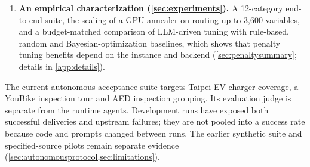 \begin{enumerate}
{        them (\cref{sec:system,sec:experiments}).} We document recurring failures (empty objectives, constraint
        penalties folded into the objective, silent over-simplification into a sortable problem, dropped hard
        constraints, exhausted reasoning budgets, prompt overflow on large models) and the generic mechanisms
        that address them: task splitting, repair instead of rewrite, constraint families and prompt budgets.
        The current system also implements bounded data-to-model repair and optional retrieval of general
        modelling patterns; their end-to-end effects require the ablations in \cref{sec:autonomousprotocol}.
  \item \textbf{An empirical characterization (\cref{sec:experiments}).} A 12-category end-to-end suite, the
        scaling of a GPU annealer on routing up to 3{,}600 variables, and a budget-matched comparison of
        LLM-driven tuning with rule-based, random and Bayesian-optimization baselines, which shows that penalty
        tuning benefits depend on the instance and backend (\cref{sec:penaltysummary}; details in \cref{app:details}).
\end{enumerate}

The current autonomous acceptance suite targets Taipei EV-charger coverage, a YouBike inspection tour and AED
inspection grouping. Its evaluation judge is separate from the runtime agents. Development runs have exposed
both successful deliveries and upstream failures; they are not pooled into a success rate because code and
prompts changed between runs. The earlier synthetic suite and specified-source pilots remain separate evidence
(\cref{sec:autonomousprotocol,sec:limitations}).
